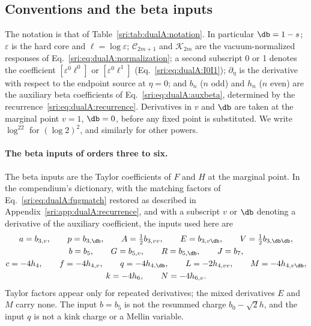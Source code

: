 \subsection{Conventions and the beta inputs}\label{sri:app:dualB:conv}
The notation is that of Table~\ref{sri:tab:dualA:notation}. In particular $\db=1-s$; $\varepsilon$ is the hard core and
$\ell=\log\varepsilon$; $\mathcal C_{2m+1}$ and $\mathcal K_{2m}$ are the vacuum-normalized responses of
Eq.~\eqref{sri:eq:dualA:normalization}; a second subscript 0 or 1 denotes the coefficient $[\varepsilon^0\ell^0]$ or
$[\varepsilon^0\ell^1]$ (Eq.~\eqref{sri:eq:dualA:I0I1}); $\partial_\eta$ is the derivative with respect to the endpoint
source at $\eta=0$; and $b_n$ ($n$ odd) and $h_n$ ($n$ even) are the auxiliary beta coefficients of
Eq.~\eqref{sri:eq:dualA:auxbeta}, determined by the recurrence~\eqref{sri:eq:dualA:recurrence}. Derivatives in $v$ and $\db$
are taken at the marginal point $v=1$, $\db=0$, before any fixed point is substituted. We write $\log^22$ for
$(\log2)^2$, and similarly for other powers.

\paragraph{The beta inputs of orders three to six.} The beta inputs are the Taylor coefficients of $F$ and $H$ at the
marginal point. In the compendium's dictionary, with the matching factors of Eq.~\eqref{sri:eq:dualA:fugmatch} restored as
described in Appendix~\ref{sri:app:dualA:recurrence}, and with a subscript $v$ or $\db$ denoting a derivative of the
auxiliary coefficient, the inputs used here are
\begin{equation}
\begin{gathered}
 a=b_{3,v},\qquad p=b_{3,\db},\qquad A=\tfrac12b_{3,vv},\qquad E=b_{3,v\db},\qquad V=\tfrac12b_{3,\db\db},\\
 b=b_5,\qquad G=b_{5,v},\qquad R=b_{5,\db},\qquad J=b_7,\\
 c=-4h_4,\qquad f=-4h_{4,v},\qquad q=-4h_{4,\db},\qquad L=-2h_{4,vv},\qquad M=-4h_{4,v\db},\\
 k=-4h_6,\qquad N=-4h_{6,v}.
\end{gathered}
\label{sri:eq:dualB:dictionary}
\end{equation}
Taylor factors appear only for repeated derivatives; the mixed derivatives $E$ and $M$ carry none. The input $b=b_5$
is not the resummed charge $b_0-\sqrt2h$, and the input $q$ is not a kink charge or a Mellin variable.

